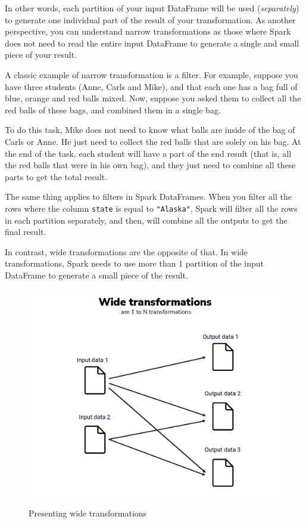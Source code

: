 \documentclass[
  11pt,
  letterpaper,
  DIV=11,
  numbers=noendperiod]{scrreprt}
\begin{document}
In other words, each partition of your input DataFrame will be used
(\emph{separately}) to generate one individual part of the result of
your transformation. As another perspective, you can understand narrow
transformations as those where Spark does not need to read the entire
input DataFrame to generate a single and small piece of your result.

A classic example of narrow transformation is a filter. For example,
suppose you have three students (Anne, Carls and Mike), and that each
one has a bag full of blue, orange and red balls mixed. Now, suppose you
asked them to collect all the red balls of these bags, and combined them
in a single bag.

To do this task, Mike does not need to know what balls are inside of the
bag of Carls or Anne. He just need to collect the red balls that are
solely on his bag. At the end of the task, each student will have a part
of the end result (that is, all the red balls that were in his own bag),
and they just need to combine all these parts to get the total result.

The same thing applies to filters in Spark DataFrames. When you filter
all the rows where the column \texttt{state} is equal to
\texttt{"Alaska"}, Spark will filter all the rows in each partition
separately, and then, will combine all the outputs to get the final
result.

In contrast, wide transformations are the opposite of that. In wide
transformations, Spark needs to use more than 1 partition of the input
DataFrame to generate a small piece of the result.

\begin{figure}

{\centering \includegraphics{Chapters/../Figures/wide-transformations.png}

}

\caption{\label{fig-wide-transformations}Presenting wide
transformations}

\end{figure}
\end{document}
